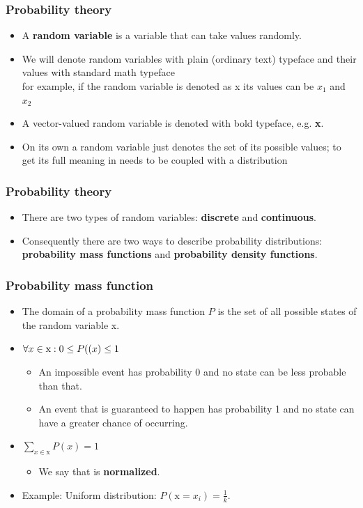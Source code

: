 \documentclass[notes]{beamer}          %
\begin{document}
\begin{frame}
\frametitle{Probability theory}
    \begin{itemize}
        \item A {\bf random variable} is a variable that can take values randomly.
        \item We will denote random variables with plain (ordinary text) typeface and their values with standard math typeface\\
        for example, if the random variable is denoted as x its values can be $x_1$ and $x_2$
        \item A vector-valued random variable is denoted with bold typeface, e.g. {\bf x}.
        \item On its own a random variable just denotes the set of its possible values; to get its full meaning in needs to be coupled with a distribution
    \end{itemize}
\end{frame}


\begin{frame}
\frametitle{Probability theory}
    \begin{itemize}
        \item There are two types of random variables: {\bf discrete} and {\bf continuous}.
        \item Consequently there are two ways to describe probability distributions: {\bf probability mass functions} and {\bf probability density functions}.
    \end{itemize}
\end{frame}


\begin{frame}
\frametitle{Probability mass function}
\begin{itemize}
    \item The domain of a probability mass function $P$ is the set of all possible states of the random variable x.
    \item $\forall x \in \text{x}: 0 \leq P(\text(x) \leq 1$
        \begin{itemize}
            \item An impossible event has probability 0 and no state can be less probable than that.
            \item An event that is guaranteed to happen has probability 1 and no state can have a greater chance of occurring.
        \end{itemize}
    \item $\sum_{x \in \text{x}} P(x) = 1$
        \begin{itemize}
            \item We say that  is {\bf normalized}.
        \end{itemize}
    \item Example: Uniform distribution: $P(\text{x} = x_i) = \frac{1}{k}$.
\end{itemize}
\end{frame}
\end{document}
